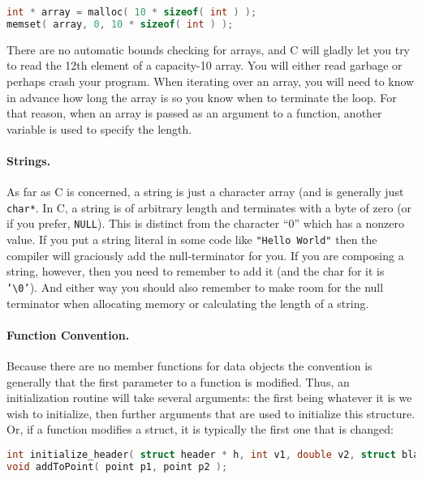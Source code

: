 \begin{lstlisting}[language=C]
int * array = malloc( 10 * sizeof( int ) );
memset( array, 0, 10 * sizeof( int ) );
\end{lstlisting}

There are no automatic bounds checking for arrays, and C will gladly let you try to read the 12th element of a capacity-10 array. You will either read garbage or perhaps crash your program. When iterating over an array, you will need to know in advance how long the array is so you know when to terminate the loop. For that reason, when an array is passed as an argument to a function, another variable is used to specify the length.

\paragraph{Strings.}

As far as C is concerned, a string is just a character array (and is generally just \texttt{char*}. In C, a string is of arbitrary length and terminates with a byte of zero (or if you prefer, \texttt{NULL}). This is distinct from the character ``0'' which has a nonzero value. If you put a string literal in some code like \texttt{"Hello World"} then the compiler will graciously add the null-terminator for you. If you are composing a string, however, then you need to remember to add it (and the char for it is \texttt{'\textbackslash0'}). And either way you should also remember to make room for the null terminator when allocating memory or calculating the length of a string.

\paragraph{Function Convention.}

Because there are no member functions for data objects the convention is generally that the first parameter to a function is modified. Thus, an initialization routine will take several arguments: the first being whatever it is we wish to initialize, then further arguments that are used to initialize this structure. Or, if a function modifies a struct, it is typically the first one that is changed:

\begin{lstlisting}[language=C]
int initialize_header( struct header * h, int v1, double v2, struct blah * v3 );
void addToPoint( point p1, point p2 );
\end{lstlisting}

